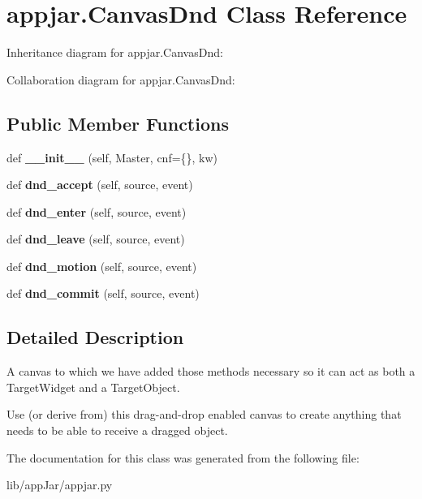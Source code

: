 \hypertarget{classappjar_1_1_canvas_dnd}{}\section{appjar.\+Canvas\+Dnd Class Reference}
\label{classappjar_1_1_canvas_dnd}


Inheritance diagram for appjar.\+Canvas\+Dnd\+:


Collaboration diagram for appjar.\+Canvas\+Dnd\+:
\subsection*{Public Member Functions}
\begin{DoxyCompactItemize}
\item 
\mbox{\label{classappjar_1_1_canvas_dnd_a85679125defd1bdc04fa899ee2205c88}} 
def {\bfseries \+\_\+\+\_\+init\+\_\+\+\_\+} (self, Master, cnf=\{\}, kw)
\item 
\mbox{\label{classappjar_1_1_canvas_dnd_a61bc7757f42af9b9e83b4fe92989d06b}} 
def {\bfseries dnd\+\_\+accept} (self, source, event)
\item 
\mbox{\label{classappjar_1_1_canvas_dnd_a85d41effb93b34fb12d9830376dfd9b2}} 
def {\bfseries dnd\+\_\+enter} (self, source, event)
\item 
\mbox{\label{classappjar_1_1_canvas_dnd_aef298b73ef59b1dbf8ebb1222a5f8ffe}} 
def {\bfseries dnd\+\_\+leave} (self, source, event)
\item 
\mbox{\label{classappjar_1_1_canvas_dnd_a1cecdcc5754557039b660bd8bf5d6c02}} 
def {\bfseries dnd\+\_\+motion} (self, source, event)
\item 
\mbox{\label{classappjar_1_1_canvas_dnd_a6101cf9f58b03037cc72125efe1ebd14}} 
def {\bfseries dnd\+\_\+commit} (self, source, event)
\end{DoxyCompactItemize}


\subsection{Detailed Description}
\begin{DoxyVerb}A canvas to which we have added those methods necessary so it can
    act as both a TargetWidget and a TargetObject.

Use (or derive from) this drag-and-drop enabled canvas to create anything
    that needs to be able to receive a dragged object.
\end{DoxyVerb}
 

The documentation for this class was generated from the following file\+:\begin{DoxyCompactItemize}
\item 
lib/app\+Jar/appjar.\+py\end{DoxyCompactItemize}
